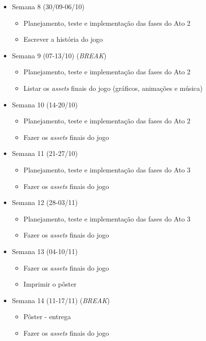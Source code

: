\documentclass[a4paper, 11pt]{article}
\begin{document}
\begin{itemize}
\item Semana 8 (30/09-06/10)
 \begin{itemize} 
 \item Planejamento, teste e implementação das fases do Ato 2
 \item Escrever a história do jogo
 \end{itemize}

\item Semana 9 (07-13/10) (\textit{BREAK})
 \begin{itemize} 
 \item Planejamento, teste e implementação das fases do Ato 2 
 \item Listar os \textit{assets} finais do jogo (gráficos, animações e música)
 \end{itemize}

\item Semana 10 (14-20/10)
 \begin{itemize} 
 \item Planejamento, teste e implementação das fases do Ato 2
 \item Fazer os \textit{assets} finais do jogo
 \end{itemize}

\item Semana 11 (21-27/10) 
 \begin{itemize} 
 \item Planejamento, teste e implementação das fases do Ato 3
 \item Fazer os \textit{assets} finais do jogo
 \end{itemize}

\item Semana 12 (28-03/11)
 \begin{itemize} 
 \item Planejamento, teste e implementação das fases do Ato 3
 \item Fazer os \textit{assets} finais do jogo
 \end{itemize}

\item Semana 13 (04-10/11) 
 \begin{itemize} 
 \item Fazer os \textit{assets} finais do jogo 
 \item Imprimir o pôster
 \end{itemize}

\item Semana 14 (11-17/11) (\textit{BREAK})
 \begin{itemize} 
 \item Pôster - entrega
 \item Fazer os \textit{assets} finais do jogo
 \end{itemize}


\end{itemize}
\end{document}
